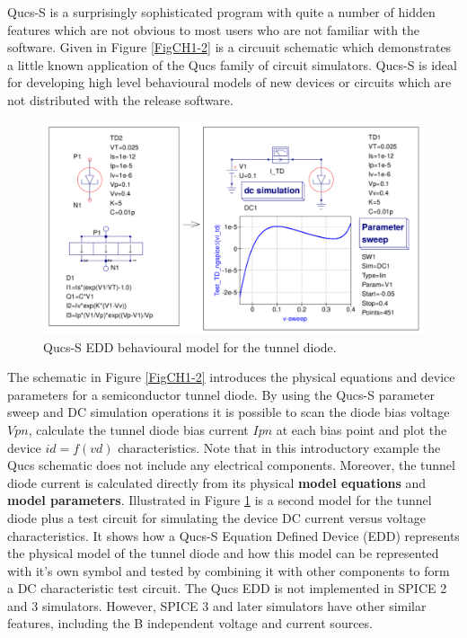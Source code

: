 \documentclass[10pt, a4paper]{report}
\begin{document}
\noindent Qucs-S is a surprisingly sophisticated program with quite a number of hidden features which are not obvious to most users who are not familiar with the software. Given in Figure \ref{FigCH1-2} is a circuuit schematic which demonstrates a little known application of the Qucs family of circuit simulators. Qucs-S is ideal for developing high level behavioural models of new devices or circuits which are not distributed with the release software.
\begin{figure}[ht]
	\centering
	\includegraphics*[width=12cm]{pics/chap1/Qucs-S-CH1-Fig3.pdf}
	\caption{Qucs-S EDD behavioural model for the tunnel diode. }
	\label{FigCH1-3}
\end{figure}
 The schematic in Figure \ref{FigCH1-2} introduces the physical equations and device parameters for a semiconductor tunnel diode. By using the Qucs-S parameter sweep and DC simulation operations it is possible to scan the diode bias voltage $Vpn$, calculate the tunnel diode bias current $Ipn$ at each bias point and plot the device $id = f(vd)$ characteristics. Note that in this introductory example the Qucs schematic does not include any electrical components. Moreover, the tunnel diode current is calculated directly from its physical \textbf{model equations} and \textbf{model parameters}.
Illustrated in Figure \ref{FigCH1-3} is a second model for the tunnel diode plus a test circuit for simulating the device DC current versus voltage characteristics.   It shows how a Qucs-S Equation Defined Device (EDD) represents the physical model of the tunnel diode and how this model can be represented with it's own symbol and tested by combining it with other components to form a DC characteristic test circuit. The Qucs EDD is not implemented in SPICE 2 and 3 simulators. However, SPICE 3 and later simulators have other similar features, including the B independent voltage and current sources.  
\end{document}

